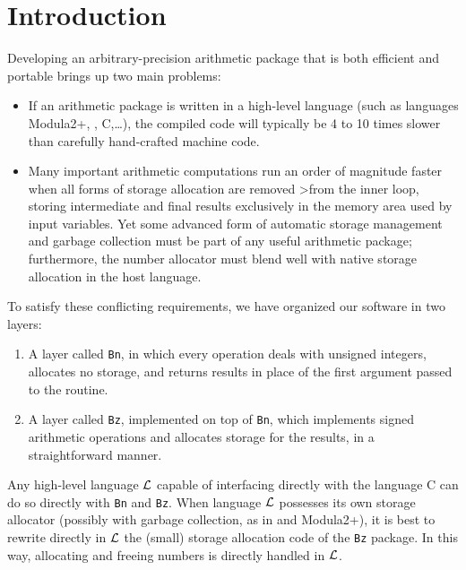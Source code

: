 
\section{Introduction}
Developing an arbitrary-precision arithmetic package that is
both efficient and portable brings up two main problems:
\begin{itemize}
  \item
If an arithmetic package is written in a  high-level language
(such as languages Modula2+, \lelisp, C,\ldots), the compiled code
will typically be 4 to 10  
times slower than carefully hand-crafted machine code.
  \item Many important arithmetic computations run an order of magnitude
faster when all forms of storage allocation are removed
>from the inner loop,
storing intermediate and final results exclusively in the memory area
used by input variables. Yet some advanced form of automatic
storage management and garbage collection must be part of any useful
arithmetic package; furthermore, the number allocator must blend well with
native storage allocation in the host language.
\end{itemize}
To satisfy these conflicting requirements, we have organized our
software in two layers:
\begin{enumerate}
  \item A layer called \verb+Bn+, in which every operation deals with unsigned
integers,  allocates no storage,
and returns results in place of the first
argument passed to the routine. 
  \item A layer called \verb+Bz+, implemented on top of \verb+Bn+,
which implements signed arithmetic operations and allocates
storage for the results, in a straightforward manner.
\end{enumerate}
 
Any high-level language ${\cal L}$
capable of interfacing directly with the
language C can do so directly with \verb+Bn+ and  \verb+Bz+. When language
${\cal L}$ possesses its own storage allocator (possibly
with garbage collection, as 
in \lelisp  and Modula2+), it is best to rewrite directly 
in ${\cal L}$ the (small)
storage allocation code of the \verb+Bz+ package. In this way, 
allocating and freeing numbers is directly handled in ${\cal L}$. 
 
